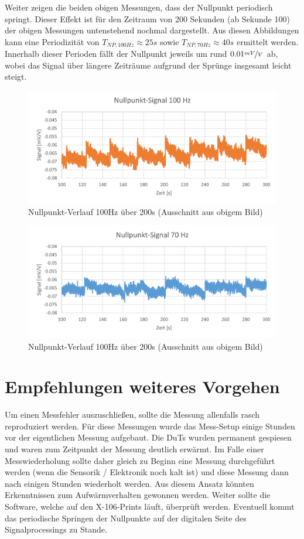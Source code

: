 \documentclass[12pt,a4paper]{article}
\begin{document}
Weiter zeigen die beiden obigen Messungen, dass der Nullpunkt periodisch springt. Dieser Effekt ist für den Zeitraum von 200 Sekunden (ab Sekunde 100) der obigen Messungen untenstehend nochmal dargestellt. Aus diesen Abbildungen kann eine Periodizität von $T_{NP, 100Hz} \approx 25s$ sowie $T_{NP, 70Hz} \approx 40s$ ermittelt werden. Innerhalb dieser Perioden fällt der Nullpunkt jeweils um rund $0.01 \nicefrac{mV}{V}$ ab, wobei das Signal über längere Zeiträume aufgrund der Sprünge insgesamt leicht steigt.
\begin{figure}[H]
	\centering
	\includegraphics[width=1\linewidth]{imgs/NP100_SHORT}
	\caption{Nullpunkt-Verlauf 100Hz über 200s (Ausschnitt aus obigem Bild)}
	\label{fig:np100short}
\end{figure}
\begin{figure}[H]
	\centering
	\includegraphics[width=1\linewidth]{imgs/NP70_SHORT}
	\caption{Nullpunkt-Verlauf 100Hz über 200s (Ausschnitt aus obigem Bild)}
	\label{fig:np70short}
\end{figure}
\section{Empfehlungen weiteres Vorgehen}
Um einen Messfehler auszuschließen, sollte die Messung allenfalls rasch reproduziert werden. Für diese Messungen wurde das Mess-Setup einige Stunden vor der eigentlichen Messung aufgebaut. Die  DuTs wurden permanent gespiesen und waren zum Zeitpunkt der Messung deutlich erwärmt. Im Falle einer Messwiederholung sollte daher gleich zu Beginn eine Messung durchgeführt werden (wenn die Sensorik / Elektronik noch kalt ist) und diese Messung dann nach einigen Stunden wiederholt werden. Aus diesem Ansatz könnten Erkenntnissen zum Aufwärmverhalten gewonnen werden. Weiter sollte die Software, welche auf den X-106-Prints läuft, überprüft werden. Eventuell kommt das periodische Springen der Nullpunkte auf der digitalen Seite des Signalprocessings zu Stande.
\end{document}

